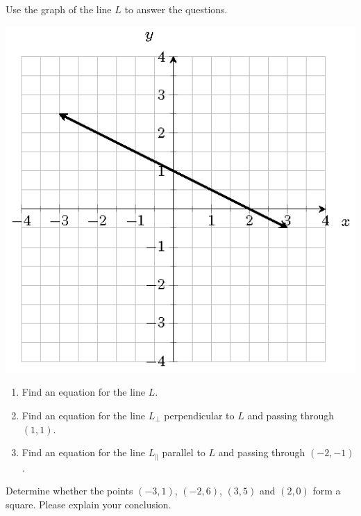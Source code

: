 \begin{exercise}

Use the graph of the line \(L\) to answer the questions.

\includegraphics[scale=1]{figs/tikz-perp-prll-exercise.png}

\begin{enumerate}
\item
  Find an equation for the line \(L\).
\item
  Find an equation for the line \(L_\perp\) perpendicular to \(L\) and
  passing through \((1,1)\).
\item
  Find an equation for the line \(L_\parallel\) parallel to \(L\) and
  passing through \((-2,-1)\).
\end{enumerate}



\end{exercise}
\vspace*{2\baselineskip}

\begin{exercise}

Determine whether the points \((-3,1)\), \((-2,6)\), \((3,5)\) and
\((2, 0)\) form a square. Please explain your conclusion.

\end{exercise}

